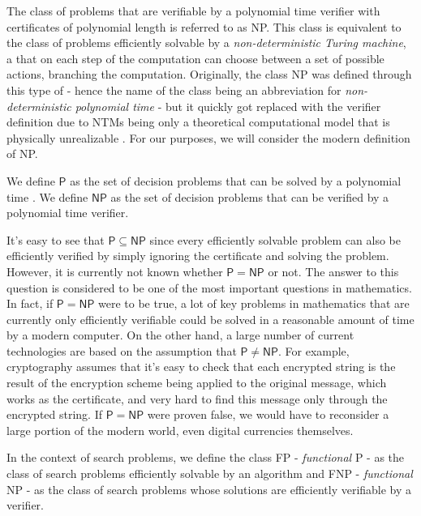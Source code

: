 The class of problems that are verifiable by a polynomial time verifier with certificates of polynomial length is referred to as \textsf{NP}. This class is equivalent to the class of problems efficiently solvable by a \textit{non-deterministic Turing machine}, a \TM that on each step of the computation can choose between a set of possible actions, branching the computation. Originally, the class \textsf{NP} was defined through this type of \TM \@ - hence the name of the class being an abbreviation for \textit{non-deterministic polynomial time} - but it quickly got replaced with the verifier definition due to \textsf{NTM}s being only a theoretical computational model that is physically unrealizable \cite{complexity_arora_barak}. For our purposes, we will consider the modern definition of \textsf{NP}.

\begin{definition}
    We define $\mathsf{P}$ as the set of decision problems that can be solved by a polynomial time \TM. We define $\mathsf{NP}$ as the set of decision problems that can be verified by a polynomial time verifier.
\end{definition}

It's easy to see that $\mathsf{P} \subseteq \mathsf{NP}$ since every efficiently solvable problem can also be efficiently verified by simply ignoring the certificate and solving the problem. However, it is currently not known whether $\mathsf{P} = \mathsf{NP}$ or not. The answer to this question is considered to be one of the most important questions in mathematics. In fact, if $\mathsf{P} = \mathsf{NP}$ were to be true, a lot of key problems in mathematics that are currently only efficiently verifiable could be solved in a reasonable amount of time by a modern computer. On the other hand, a large number of current technologies are based on the assumption that $\mathsf{P} \neq \mathsf{NP}$. For example, cryptography assumes that it's easy to check that each encrypted string is the result of the encryption scheme being applied to the original message, which works as the certificate, and very hard to find this message only through the encrypted string. If $\mathsf{P} = \mathsf{NP}$ were proven false, we would have to reconsider a large portion of the modern world, even digital currencies themselves.

In the context of search problems, we define the class \textsf{FP} - \textit{functional} \textsf{P} - as the class of search problems efficiently solvable by an algorithm and \textsf{FNP} - \textit{functional} \textsf{NP} - as the class of search problems whose solutions are efficiently verifiable by a verifier. 

